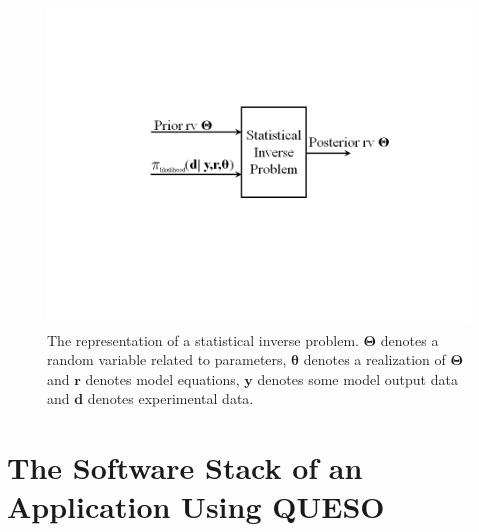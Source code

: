 \begin{figure}[h!]
\centerline{
\includegraphics[scale=0.45,clip=true,viewport=1.0in 3.0in 10.0in 5.5in]{figs/queso_paper1_10}
}
\caption{
The representation of a statistical inverse problem.
$\boldsymbol{\Theta}$ denotes a random variable related to parameters,
$\boldsymbol{\theta}$ denotes a realization of $\boldsymbol{\Theta}$ and
$\mathbf{r}$ denotes model equations,
$\mathbf{y}$ denotes some model output data and
$\mathbf{d}$ denotes experimental data.
}
\label{fig-sip-queso}
\end{figure}

\section{The Software Stack of an Application Using QUESO}

